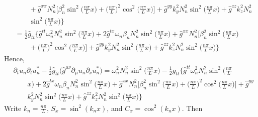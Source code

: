 \documentclass[english]{article}
\begin{document}
\begin{align*}
 & \qquad+\hat{g}^{xx}N^{2}_{n}\biggl[\beta^{2}_{n}\sin^{2}\biggl(\frac{n\pi}{L}x\biggr)+\biggl(\frac{n\pi}{L}\biggr)^{2}\cos^{2}\biggl(\frac{n\pi}{L}x\biggr)\biggr]+\hat{g}^{yy}k^{2}_{y}N^{2}_{n}\sin^{2}\biggl(\frac{n\pi}{L}x\biggr)+\hat{g}^{zz}k^{2}_{z}N^{2}_{n}\\
 & \qquad\sin^{2}\biggl(\frac{n\pi}{L}x\biggr)\biggr\}\\
 & =\frac{1}{2}\hat{g}_{tt}\biggl\{\hat{g}^{tt}\omega^{2}_{n}N^{2}_{n}\sin^{2}\biggl(\frac{n\pi}{L}x\biggr)+2\hat{g}^{tx}\omega_{n}\beta_{n}N^{2}_{n}\sin^{2}\biggl(\frac{n\pi}{L}x\biggr)+\hat{g}^{xx}N^{2}_{n}\biggl[\beta^{2}_{n}\sin^{2}\biggl(\frac{n\pi}{L}x\biggr)\\
 & \qquad+\biggl(\frac{n\pi}{L}\biggr)^{2}\cos^{2}\biggl(\frac{n\pi}{L}x\biggr)\biggr]+\hat{g}^{yy}k^{2}_{y}N^{2}_{n}\sin^{2}\biggl(\frac{n\pi}{L}x\biggr)+\hat{g}^{zz}k^{2}_{z}N^{2}_{n}\sin^{2}\biggl(\frac{n\pi}{L}x\biggr)\biggr\}
\end{align*}
 Hence, 
\begin{align*}
 & \partial_{t}u_{n}\partial_{t}u^{*}_{n}-\frac{1}{2}\hat{g}_{tt}\biggl(\hat{g}^{\mu\nu}\partial_{\mu}u_{n}\partial_{\nu}u^{*}_{n}\biggr)=\omega^{2}_{n}N^{2}_{n}\sin^{2}\biggl(\frac{n\pi}{L}x\biggr)-\frac{1}{2}\hat{g}_{tt}\biggl\{\hat{g}^{tt}\omega^{2}_{n}N^{2}_{n}\sin^{2}\biggl(\frac{n\pi}{L}\\
 & \qquad x\biggr)+2\hat{g}^{tx}\omega_{n}\beta_{n}N^{2}_{n}\sin^{2}\biggl(\frac{n\pi}{L}x\biggr)+\hat{g}^{xx}N^{2}_{n}\biggl[\beta^{2}_{n}\sin^{2}\biggl(\frac{n\pi}{L}x\biggr)+\biggl(\frac{n\pi}{L}\biggr)^{2}\cos^{2}\biggl(\frac{n\pi}{L}x\biggr)\biggr]+\hat{g}^{yy}\\
 & \qquad k^{2}_{y}N^{2}_{n}\sin^{2}\biggl(\frac{n\pi}{L}x\biggr)+\hat{g}^{zz}k^{2}_{z}N^{2}_{n}\sin^{2}\biggl(\frac{n\pi}{L}x\biggr)\biggr\}
\end{align*}
 Write $k_{n}=\frac{n\pi}{L}$, $S_{x}=\sin^{2}\left(k_{n}x\right)$,
and $C_{x}=\cos^{2}\left(k_{n}x\right)$. Then 
\end{document}
